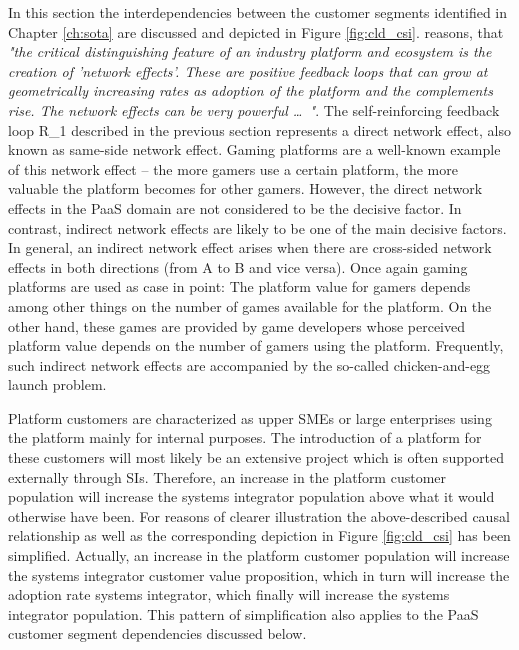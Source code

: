 In this section the interdependencies between the customer segments identified in Chapter \ref{ch:sota} are discussed and depicted in Figure \ref{fig:cld_csi}. \citet[p. 33]{Cusumano2010} reasons, that \textit{"the critical distinguishing feature of an industry platform and ecosystem is the creation of 'network effects'. These are positive feedback loops that can grow at geometrically increasing rates as adoption of the platform and the complements rise. The network effects can be very powerful \ldots~"}. The self-reinforcing feedback loop R\_1 described in the previous section represents a direct network effect, also known as same-side network effect. Gaming platforms are a well-known example of this network effect -- the more gamers use a certain platform, the more valuable the platform becomes for other gamers. However, the direct network effects in the \ac{PaaS} domain are not considered to be the decisive factor. In contrast, indirect network effects are likely to be one of the main decisive factors. In general, an indirect network effect arises when there are cross-sided network effects in both directions (from A to B and vice versa). Once again gaming platforms are used as case in point: The platform value for gamers depends among other things on the number of games available for the platform. On the other hand, these games are provided by game developers whose perceived platform value depends on the number of gamers using the platform. Frequently, such indirect network effects are accompanied by the so-called chicken-and-egg launch problem. 

Platform customers are characterized as upper \acp{SME} or large enterprises using the platform mainly for internal purposes. The introduction of a platform for these customers will most likely be an extensive project which is often supported externally through \acp{SI}. Therefore, an increase in the platform customer population will increase the systems integrator population above what it would otherwise have been. For reasons of clearer illustration the above-described causal relationship as well as the corresponding depiction in Figure \ref{fig:cld_csi} has been simplified. Actually, an increase in the platform customer population will increase the systems integrator customer value proposition, which in turn will increase the adoption rate systems integrator, which finally will increase the systems integrator population. This pattern of simplification also applies to the \ac{PaaS} customer segment dependencies discussed below.

